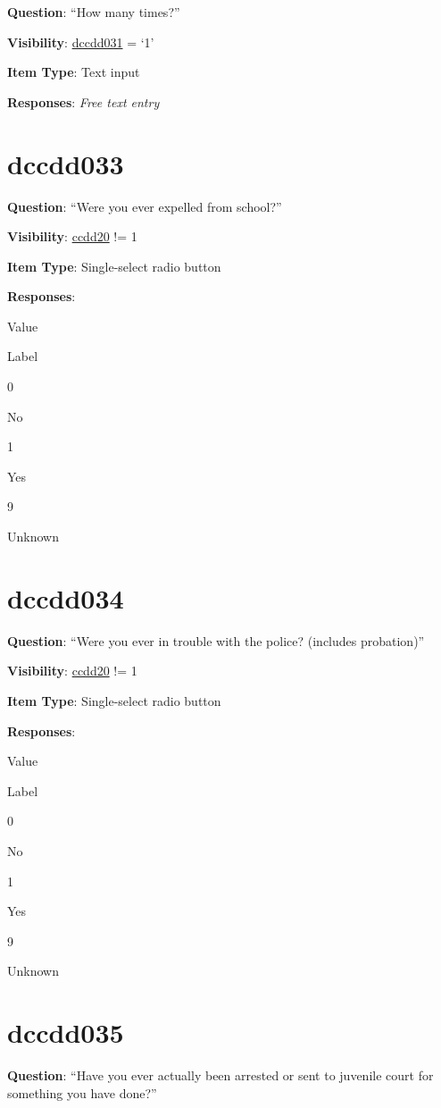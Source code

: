 \documentclass[]{book}
\begin{document}
\textbf{Question}: ``How many times?''

\textbf{Visibility}: \protect\hyperlink{dccdd031}{dccdd031} = `1'

\textbf{Item Type}: Text input

\textbf{Responses}: \emph{Free text entry}

\hypertarget{dccdd033}{%
\section{dccdd033}\label{dccdd033}}

\textbf{Question}: ``Were you ever expelled from school?''

\textbf{Visibility}: \protect\hyperlink{ccdd20}{ccdd20} != 1

\textbf{Item Type}: Single-select radio button

\textbf{Responses}:

Value

Label

0

No

1

Yes

9

Unknown

\hypertarget{dccdd034}{%
\section{dccdd034}\label{dccdd034}}

\textbf{Question}: ``Were you ever in trouble with the police? (includes probation)''

\textbf{Visibility}: \protect\hyperlink{ccdd20}{ccdd20} != 1

\textbf{Item Type}: Single-select radio button

\textbf{Responses}:

Value

Label

0

No

1

Yes

9

Unknown

\hypertarget{dccdd035}{%
\section{dccdd035}\label{dccdd035}}

\textbf{Question}: ``Have you ever actually been arrested or sent to juvenile court for something you have done?''
\end{document}
